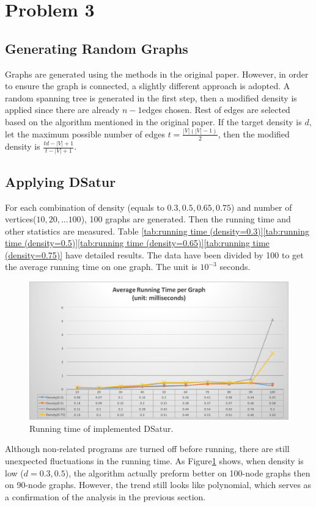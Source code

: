 \documentclass[paper=a4, fontsize=11pt]{scrartcl} %
\numberwithin{equation}{section} %
\numberwithin{figure}{section} %
\numberwithin{table}{section} %
\begin{document}
\section{Problem 3}
\subsection{Generating Random Graphs}
Graphs are generated using the methods in the original paper\cite{DSatur}. However, in order to ensure the graph is connected, a slightly different approach is adopted. A random spanning tree is generated in the first step, then a modified density is applied since there are already $n-1$edges chosen. Rest of edges are selected based on the algorithm mentioned in the original paper. If the target density is $d$, let the maximum possible number of edges $t=\frac{|V|(|V|-1)}{2}$, then the modified density is $\frac{td-|V|+1}{t-|V|+1}$.
\subsection{Applying DSatur}
For each combination of density (equals to $0.3, 0.5, 0.65, 0.75$) and number of vertices($10,20, ... 100$), 100 graphs are generated. Then the running time and other statistics are measured. Table \ref{tab:running time (density=0.3)}\ref{tab:running time (density=0.5)}\ref{tab:running time (density=0.65)}\ref{tab:running time (density=0.75)} have detailed results. The data have been divided by 100 to get the average running time on one graph. The unit is $10^{-3}$ seconds. 
\begin{figure}[htp]
\centering
\includegraphics[width=13cm]{runningtime}
\centering
\caption{Running time of implemented DSatur. }
\label{fig:runtime}
\end{figure}

Although non-related programs are turned off before running, there are still unexpected fluctuations in the running time. As Figure\ref{fig:runtime} shows, when density is low ($d = 0.3, 0.5$), the algorithm actually preform better on 100-node graphs then on 90-node graphs.  However, the trend still looks like polynomial, which serves as a confirmation of the analysis in the previous section.
\end{document}
